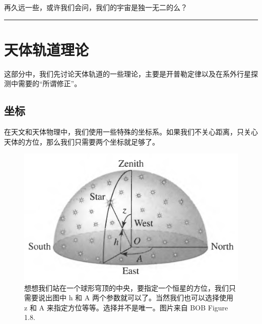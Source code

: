 \documentclass[letterpaper,10pt,english]{sphinxmanual}
\begin{document}
再久远一些，或许我们会问，我们的宇宙是独一无二的么？


\bigskip\hrule{}\bigskip



\section{天体轨道理论}
\label{orbits::doc}\label{orbits:id1}
这部分中，我们先讨论天体轨道的一些理论，主要是开普勒定律以及在系外行星探测中需要的“所谓修正”。


\subsection{坐标}
\label{orbits:id2}\label{orbits:index-1}
在天文和天体物理中，我们使用一些特殊的坐标系。如果我们不关心距离，只关心天体的方位，那么我们只需要两个坐标就足够了。
\begin{figure}[htbp]
\centering
\capstart

\includegraphics{altitude-azimuth-system.png}
\caption{想想我们站在一个球形穹顶的中央，要指定一个恒星的方位，我们只需要说出图中 h 和 A 两个参数就可以了。当然我们也可以选择使用 z 和 A 来指定方位等等。选择并不是唯一。图片来自 BOB Figure 1.8.}\end{figure}
\end{document}
